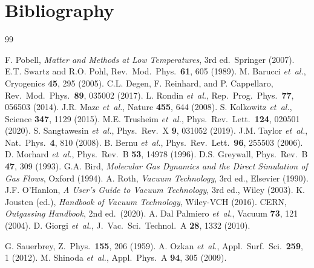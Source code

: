 \documentclass[12pt,a4paper]{article}
\begin{document}
\section*{Bibliography}
\begin{thebibliography}{99}

 F. Pobell, \textit{Matter and Methods at Low Temperatures}, 3rd ed.\ Springer (2007).
 E.T. Swartz and R.O. Pohl, Rev.\ Mod.\ Phys.\ \textbf{61}, 605 (1989).
 M. Barucci \emph{et~al.}, Cryogenics \textbf{45}, 295 (2005).
 C.L. Degen, F. Reinhard, and P. Cappellaro, Rev.\ Mod.\ Phys.\ \textbf{89}, 035002 (2017).
 L. Rondin \emph{et~al.}, Rep.\ Prog.\ Phys.\ \textbf{77}, 056503 (2014).
 J.R. Maze \emph{et~al.}, Nature \textbf{455}, 644 (2008).
 S. Kolkowitz \emph{et~al.}, Science \textbf{347}, 1129 (2015).
 M.E. Trusheim \emph{et~al.}, Phys.\ Rev.\ Lett.\ \textbf{124}, 020501 (2020).
 S. Sangtawesin \emph{et~al.}, Phys.\ Rev.\ X \textbf{9}, 031052 (2019).
 J.M. Taylor \emph{et~al.}, Nat.\ Phys.\ \textbf{4}, 810 (2008).
 B. Bernu \emph{et~al.}, Phys.\ Rev.\ Lett.\ \textbf{96}, 255503 (2006).
 D. Morhard \emph{et~al.}, Phys.\ Rev.\ B \textbf{53}, 14978 (1996).
 D.S. Greywall, Phys.\ Rev.\ B \textbf{47}, 309 (1993).
 G.A. Bird, \textit{Molecular Gas Dynamics and the Direct Simulation of Gas Flows}, Oxford (1994).
 A. Roth, \textit{Vacuum Technology}, 3rd ed., Elsevier (1990).
 J.F. O'Hanlon, \textit{A User's Guide to Vacuum Technology}, 3rd ed., Wiley (2003).
 K. Jousten (ed.), \textit{Handbook of Vacuum Technology}, Wiley-VCH (2016).
 CERN, \textit{Outgassing Handbook}, 2nd ed.\ (2020).
 A. Dal Palmiero \emph{et~al.}, Vacuum \textbf{73}, 121 (2004).
 D. Giorgi \emph{et~al.}, J.\ Vac.\ Sci.\ Technol.\ A \textbf{28}, 1332 (2010).

 G. Sauerbrey, Z.\ Phys.\ \textbf{155}, 206 (1959).
 A. Ozkan \emph{et~al.}, Appl.\ Surf.\ Sci.\ \textbf{259}, 1 (2012).
 M. Shinoda \emph{et~al.}, Appl.\ Phys.\ A \textbf{94}, 305 (2009).
\end{thebibliography}
\end{document}
